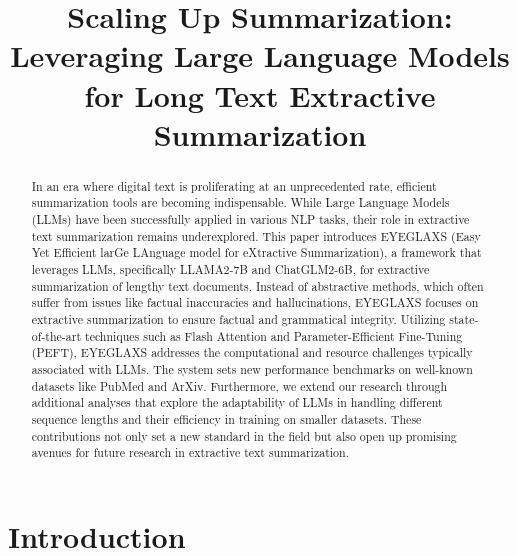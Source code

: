 \title{Scaling Up Summarization: Leveraging Large Language Models for Long Text Extractive Summarization}



\maketitle

\begin{abstract}
In an era where digital text is proliferating at an unprecedented rate, efficient summarization tools are becoming indispensable. While Large Language Models (LLMs) have been successfully applied in various NLP tasks, their role in extractive text summarization remains underexplored. This paper introduces EYEGLAXS (Easy Yet Efficient larGe LAnguage model for eXtractive Summarization), a framework that leverages LLMs, specifically LLAMA2-7B and ChatGLM2-6B, for extractive summarization of lengthy text documents. Instead of abstractive methods, which often suffer from issues like factual inaccuracies and hallucinations, EYEGLAXS focuses on extractive summarization to ensure factual and grammatical integrity. Utilizing state-of-the-art techniques such as Flash Attention and Parameter-Efficient Fine-Tuning (PEFT), EYEGLAXS addresses the computational and resource challenges typically associated with LLMs. The system sets new performance benchmarks on well-known datasets like PubMed and ArXiv. Furthermore, we extend our research through additional analyses that explore the adaptability of LLMs in handling different sequence lengths and their efficiency in training on smaller datasets. These contributions not only set a new standard in the field but also open up promising avenues for future research in extractive text summarization.
\end{abstract}

\section{Introduction}

 

